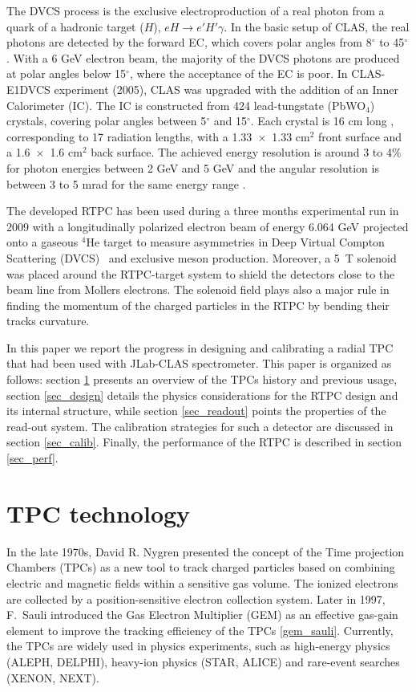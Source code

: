 \documentclass[twocolumn,showpacs,superscriptaddress,groupedaddress]{revtex4}
\begin{document}
The DVCS process is the exclusive electroproduction of a real photon from a 
quark of a hadronic target ($H$), $eH \rightarrow e' H' \gamma$. In the basic 
setup of CLAS, the real photons are detected by the forward EC, which covers 
polar angles from 8$^{\circ}$ to 45$^{\circ}$. With a 6 GeV electron beam, the 
majority of the DVCS photons are produced at polar angles below 15$^{\circ}$, 
where the acceptance of the EC is poor. In CLAS-E1DVCS experiment (2005), CLAS 
was upgraded with the addition of an Inner Calorimeter (IC). The IC is 
constructed from 424 lead-tungstate (PbWO$_{4}$) crystals, covering polar 
angles between 5$^{\circ}$ and 15$^{\circ}$. Each crystal is 16 cm long ,
corresponding to 17 radiation lengths, with a 1.33~$\times$~1.33 cm$^2$ front 
surface and a 1.6~$\times$~1.6 cm$^2$ back surface. The achieved energy 
resolution is around 3 to 4$\%$ for photon energies between 2 GeV and 5 GeV and 
the angular resolution is between 3 to 5 mrad for the same energy range 
\cite{Hyon-suk}.

The developed RTPC has been used during a three months experimental run in 2009 
with a longitudinally polarized electron beam of energy 6.064 GeV projected 
onto a gaseous $^{4}$He target to measure asymmetries in Deep Virtual Compton 
Scattering (DVCS)~\cite{proposal} and exclusive meson production. Moreover, a 
5~T solenoid was placed around the RTPC-target system to shield the detectors 
close to the beam line from Mollers electrons. The solenoid field plays also a 
major rule in finding the momentum of the charged particles in the RTPC by 
bending their tracks curvature.

In this paper we report the progress in designing and calibrating a radial TPC 
that had been used with JLab-CLAS spectrometer. This paper is organized as 
follows: section \ref{prev_tpc} presents an overview of the TPCs history and 
previous usage, section \ref{sec_design} details the physics considerations for 
the RTPC design and its internal structure, while section \ref{sec_readout} 
points the properties of the read-out system. The calibration strategies for 
such a detector are discussed in section \ref{sec_calib}. Finally, the 
performance of the RTPC is described in section \ref{sec_perf}.

\section{TPC technology} \label{prev_tpc}
In the late 1970s, David R. Nygren presented the concept of the Time projection 
Chambers (TPCs) as a new tool to track charged particles based on combining 
electric and magnetic fields within a sensitive gas volume. The ionized 
electrons are collected by a position-sensitive electron collection system.  
Later in 1997, F.~Sauli introduced the Gas Electron Multiplier (GEM) as an 
effective gas-gain element to improve the tracking efficiency of the TPCs 
\ref{gem_sauli}. Currently, the TPCs are widely used in physics experiments, 
such as high-energy physics (ALEPH, DELPHI), heavy-ion physics (STAR, ALICE) 
and rare-event searches (XENON, NEXT).
\end{document}
